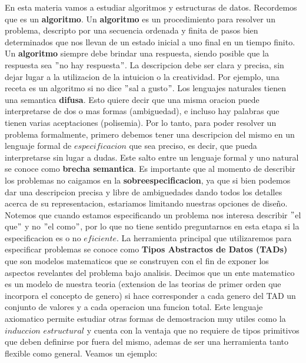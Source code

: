 \documentclass[10pt,a4paper]{article}
\begin{document}
En esta materia vamos a estudiar algoritmos y estructuras de datos. Recordemos que es un \textbf{algoritmo}.
\newline
\newline
Un \textbf{algoritmo} es un procedimiento para resolver un problema, descripto por una secuencia ordenada y finita de pasos bien determinados que nos llevan de un estado inicial a uno final en un tiempo finito. 
\newline
\newline
Un \textbf{algoritmo} siempre debe brindar una respuesta, siendo posible que la respuesta sea $"$no hay respuesta$"$. La descripcion debe ser clara y precisa, sin dejar lugar a la utilizacion de la intuicion o la creatividad. Por ejemplo, una receta es un algoritmo si no dice $"$sal a gusto$"$.  
\newline
\newline
Los lenguajes naturales tienen una semantica \textbf{difusa}. Esto quiere decir que una misma oracion puede interpretarse de dos o mas formas (ambiguedad), e incluso hay palabras que tienen varias aceptaciones (polisemia). Por lo tanto, para poder resolver un problema formalmente, primero debemos tener una descripcion del mismo en un lenguaje formal de $especificacion$ que sea preciso, es decir, que pueda interpretarse sin lugar a dudas. Este salto entre un lenguaje formal y uno natural se conoce como \textbf{brecha semantica}.
\newline
\newline
Es importante que al momento de describir los problemas no caigamos en la \textbf{sobreespecificacion}, ya que si bien podemos dar una descripcion precisa y libre de ambiguedades dando todos los detalles acerca de su representacion, estariamos limitando nuestras opciones de diseño. Notemos que cuando estamos especificando un problema nos interesa describir $"$el que$"$ y no $"$el como$"$, por lo que no tiene sentido preguntarnos en esta etapa si la especificacion es o no $eficiente$.
\newline
\newline
La herramienta principal que utilizaremos para especificar problemas se conoce como \textbf{Tipos Abstractos de Datos (TADs)} que son modelos matematicos que se construyen con el fin de exponer los aspectos revelantes del problema bajo analisis. Decimos que un ente matematico es un modelo de nuestra teoria (extension de las teorias de primer orden que incorpora el concepto de genero) si hace corresponder a cada genero del TAD un conjunto de valores y a cada operacion una funcion total. Este lenguaje axiomatico permite estudiar otras formas de demostracion muy utiles como la $induccion$ $estructural$ y cuenta con la ventaja que no requiere de tipos primitivos que deben definirse por fuera del mismo, ademas de ser una herramienta tanto flexible como general. Veamos un ejemplo:
\end{document}
